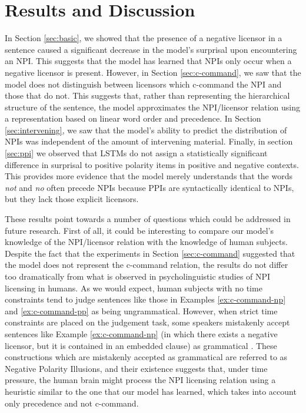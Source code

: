 \documentclass[11pt, round]{article}
\begin{document}
\section{Results and Discussion}

In Section \ref{sec:basic}, we showed that the presence of a negative licensor in a sentence caused a significant decrease in the model's surprisal upon encountering an NPI. This suggests that the model has learned that NPIs only occur when a negative licensor is present. However, in Section \ref{sec:c-command}, we saw that the model does not distinguish between licensors which c-command the NPI and those that do not. This suggests that, rather than representing the hierarchical structure of the sentence, the model approximates the NPI/licensor relation using a representation based on linear word order and precedence. In Section \ref{sec:intervening}, we saw that the model's ability to predict the distribution of NPIs was independent of the amount of intervening material. Finally, in section \ref{sec:ppi} we observed that LSTMs do not assign a statistically significant difference in surprisal to positive polarity items in positive and negative contexts. This provides more evidence that the model merely understands that the words \textit{not} and \textit{no} often precede NPIs because PPIs are syntactically identical to NPIs, but they lack those explicit licensors.

These results point towards a number of questions which could be addressed in future research. First of all, it could be interesting to compare our model's knowledge of the NPI/licensor relation with the knowledge of human subjects. Despite the fact that the experiments in Section \ref{sec:c-command} suggested that the model does not represent the c-command relation, the results do not differ too dramatically from what is observed in psycholinguistic studies of NPI licensing in humans. As we would expect, human subjects with no time constraints tend to judge sentences like those in Examples \ref{ex:c-command-np} and \ref{ex:c-command-pp} as being ungrammatical. However, when strict time constraints are placed on the judgement task, some speakers mistakenly accept sentences like Example \ref{ex:c-command-np} (in which there exists a negative licensor, but it is contained in an embedded clause) as grammatical \cite{xiang2009illusory,xiang2013dependency,parker2016negative}. These constructions which are mistakenly accepted as grammatical are referred to as Negative Polarity Illusions, and their existence suggests that, under time pressure, the human brain might process the NPI licensing relation using a heuristic similar to the one that our model has learned, which takes into account only precedence and not c-command. 
\end{document}
